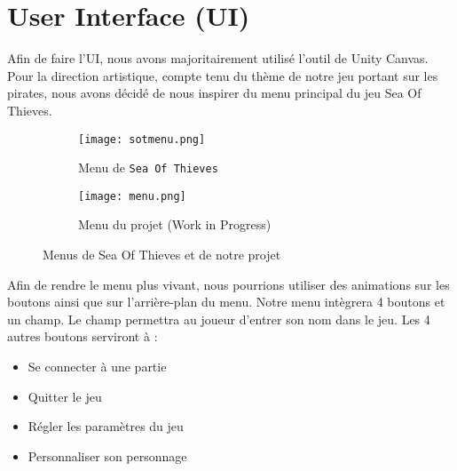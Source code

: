 \documentclass[../doc.tex]{subfiles}
\begin{document}
    \section{User Interface (UI)}
    Afin de faire l’UI, nous avons majoritairement utilisé l’outil de Unity Canvas. 
    Pour la direction artistique, compte tenu du thème de notre jeu portant sur les pirates, 
    nous avons décidé de nous inspirer du menu principal du jeu Sea Of Thieves. \newline
    
    \begin{figure}[!hbt]
        \centering
        \begin{subfigure}[t]{0.2\textwidth}
            \texttt{[image: sotmenu.png]} 
            \caption{Menu de \texttt{Sea Of Thieves}}
        \end{subfigure}
        \hspace{125pt}
        \begin{subfigure}[t]{0.3\textwidth}
            \texttt{[image: menu.png]}
            \caption{Menu du projet (Work in Progress)}
        \end{subfigure}
        \caption{Menus de Sea Of Thieves et de notre projet}
    \end{figure}
    
    Afin de rendre le menu plus vivant, 
    nous pourrions utiliser des animations sur les boutons ainsi que sur l’arrière-plan du menu.\newline 
    Notre menu intègrera 4 boutons et un champ. Le champ permettra au joueur d’entrer son nom dans le jeu. \newline
    Les 4 autres boutons serviront à :
    \begin{itemize}
        \item Se connecter à une partie
        \item Quitter le jeu
        \item Régler les paramètres du jeu
        \item Personnaliser son personnage
    \end{itemize}
\end{document}
